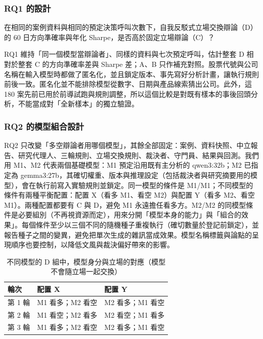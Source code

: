 \subsubsection{RQ1 的設計}
在相同的案例資料與相同的預定決策呼叫次數下，自我反駁式立場交換辯論（D）的 60 日方向準確率與年化 Sharpe，是否高於固定立場辯論（C）？

RQ1 維持「同一個模型當辯論者」、同樣的資料與七次預定呼叫，估計整套 D 相對於整套 C 的方向準確率差與 Sharpe 差；A、B 只作補充對照。股票代號與公司名稱在輸入模型時都做了匿名化，並且鎖定版本、事先寫好分析計畫，讓執行規則前後一致。匿名化並不能排除模型從數字、日期與產品線索猜出公司。此外，這 180 案先前已用於前導試跑與規則調整，所以這個比較是對既有樣本的事後回頭分析，不能當成對「全新樣本」的獨立驗證。

\subsubsection{RQ2 的模型組合設計}

RQ2 只改變「多空辯論者用哪個模型」，其餘全部固定：案例、資料快照、中立報告、研究代理人、三輪規則、立場交換規則、裁決者、守門員、結果與回測。我們用 M1、M2 代表兩個基礎模型：M1 預定沿用既有主分析的 qwen3:32b；M2 已指定為 gemma3:27b，其確切權重、版本與推理設定（包括裁決者與研究摘要用的模型），會在執行前寫入實驗規則並鎖定。同一模型的條件是 M1/M1；不同模型的條件有兩種平衡配置：配置 X（看多 M1、看空 M2）與配置 Y（看多 M2、看空 M1）。兩種配置都要有 C 與 D，避免 M1 永遠擔任看多方。M2/M2 的同模型條件是必要組別（不再視資源而定），用來分開「模型本身的能力」與「組合的效果」。每個條件至少以三個不同的隨機種子重複執行（確切數量於登記前鎖定），並報告種子之間的變異，避免把單次生成的雜訊當成效果。模型名稱標籤與論點的呈現順序也要控制，以降低文風與裁決偏好帶來的影響。

\begin{table}[H]\centering\small
\caption{不同模型的 D 組中，模型身分與立場的對應（模型不會隨立場一起交換）}
\begin{tabularx}{\textwidth}{@{}lYY@{}}\toprule
輪次 & 配置 X & 配置 Y\\\midrule
第 1 輪 & M1 看多；M2 看空 & M2 看多；M1 看空\\
第 2 輪 & M1 看空；M2 看多 & M2 看空；M1 看多\\
第 3 輪 & M1 看多；M2 看空 & M2 看多；M1 看空\\\bottomrule\end{tabularx}\end{table}

